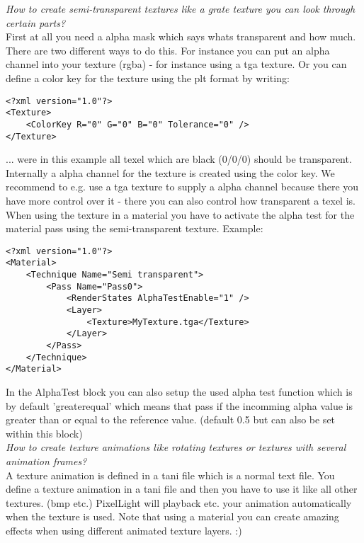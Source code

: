 \emph{How to create semi-transparent textures like a grate texture you can look through certain parts?}\\
First at all you need a alpha mask which says whats transparent and how much.
There are two different ways to do this. For instance you can put an alpha channel into your
texture (rgba) - for instance using a tga texture. Or you can define a color key for the texture
using the plt format by writing:\\

\begin{lstlisting}[caption=plt-file color key]
<?xml version="1.0"?>
<Texture>
	<ColorKey R="0" G="0" B="0" Tolerance="0" />
</Texture>
\end{lstlisting}

... were in this example all texel which are black (0/0/0) should be transparent. Internally a
alpha channel for the texture is created using the color key. We recommend to e.g. use a tga
texture to supply a alpha channel because there you have more control over it - there you can
also control how transparent a texel is.\\
    
When using the texture in a material you have to activate the alpha test for the material pass
using the semi-transparent texture. Example:\\

\begin{lstlisting}[caption=Semi-transparent material]
<?xml version="1.0"?>
<Material>
	<Technique Name="Semi transparent">
		<Pass Name="Pass0">
			<RenderStates AlphaTestEnable="1" />
			<Layer>
				<Texture>MyTexture.tga</Texture>
			</Layer>
		</Pass>
	</Technique>
</Material>
\end{lstlisting}

In the AlphaTest block you can also setup the used alpha test function which is by default 'greaterequal' 
which means that pass if the incomming alpha value is greater than or equal to the reference value.
(default 0.5 but can also be set within this block)\\


\emph{How to create texture animations like rotating textures or textures with several animation frames?}\\
A texture animation is defined in a tani file which is a normal text file. You define a texture
animation in a tani file and then you have to use it like all other textures. (bmp etc.) PixelLight
will playback etc. your animation automatically when the texture is used. Note that using a material
you can create amazing effects when using different animated texture layers. :)\\



